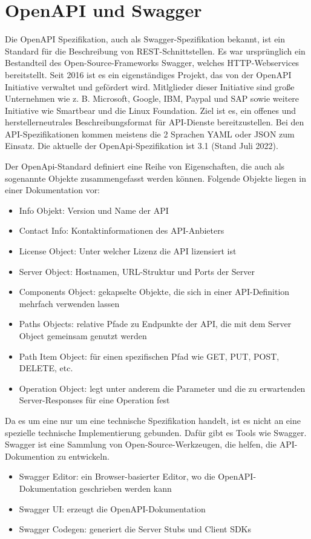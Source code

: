 \newpage
\section{OpenAPI und Swagger}
\cite{OpenAPISwaggerOfficial}
\cite{OpenAPISwaggerWikipedia}
\cite{OpenAPISwaggerIONOS}

Die OpenAPI Spezifikation, auch als Swagger-Spezifikation bekannt, ist ein Standard für die Beschreibung von 
REST-Schnittstellen. Es war ursprünglich ein Bestandteil des Open-Source-Frameworks Swagger, welches HTTP-Webservices bereitstellt.
Seit 2016 ist es ein eigenständiges Projekt, das von der OpenAPI Initiative verwaltet und gefördert wird. 
Mitlglieder dieser Initiative sind große Unternehmen wie z. B. Microsoft, Google, IBM, Paypal und SAP sowie weitere Initiative wie Smartbear und die Linux Foundation.
Ziel ist es, ein offenes und herstellerneutrales Beschreibungsformat für API-Dienste bereitzustellen. Bei den API-Spezifikationen kommen meistens die 2 Sprachen YAML oder JSON zum Einsatz. 
Die aktuelle der OpenApi-Spezifikation ist 3.1 (Stand Juli 2022). 

Der OpenApi-Standard definiert eine Reihe von Eigenschaften, die auch als sogenannte Objekte zusammengefasst werden können. 
Folgende Objekte liegen in einer Dokumentation vor:
\begin{itemize}
    \item Info Objekt: Version und Name der API
    \item Contact Info: Kontaktinformationen des API-Anbieters
    \item License Object: Unter welcher Lizenz die API lizensiert ist
    \item Server Object: Hostnamen, URL-Struktur und Ports der Server
    \item Components Object: gekapselte Objekte, die sich in einer API-Definition mehrfach verwenden lassen
    \item Paths Objects: relative Pfade zu Endpunkte der API, die mit dem Server Object gemeinsam genutzt werden
    \item Path Item Object: für einen spezifischen Pfad wie GET, PUT, POST, DELETE, etc.
    \item Operation Object: legt unter anderem die Parameter und die zu erwartenden Server-Responses für eine Operation fest
\end{itemize}

Da es um eine nur um eine technische Spezifikation handelt, ist es nicht an eine spezielle technische Implementierung gebunden. Dafür gibt es Tools wie Swagger. 
Swagger ist eine Sammlung von Open-Source-Werkzeugen, die helfen, die API-Dokumention zu entwickeln. 
\begin{itemize}
    \item Swagger Editor: ein Browser-basierter Editor, wo die OpenAPI-Dokumentation geschrieben werden kann
    \item Swagger UI: erzeugt die OpenAPI-Dokumentation
    \item Swagger Codegen: generiert die Server Stubs und Client SDKs
\end{itemize}

